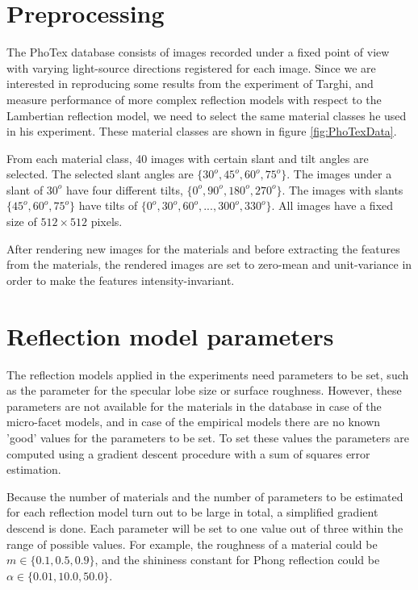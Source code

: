 \hypertarget{experiments}{
}

\section{Preprocessing}\label{sec:preprocessing}
	The PhoTex database consists of images recorded under a fixed point of view with varying light-source directions registered for each image. Since we are interested in reproducing some results from the experiment of Targhi, and measure performance of more complex reflection models with respect to the Lambertian reflection model, we need to select the same material classes he used in his experiment. These material classes are shown in figure \ref{fig:PhoTexData}.

From each material class, 40 images with certain slant and tilt angles are selected. The selected slant angles are $\{30^o, 45^o,60^o,75^o\}$. The images under a slant of $30^o$ have four different tilts, $\{0^o, 90^o, 180^o, 270^o\}$. The images with slants $\{45^o,60^o,75^o\}$ have tilts of $\{0^o,30^o,60^o,...,300^o,330^o\}$. All images have a fixed size of $512 \times 512$ pixels.

After rendering new images for the materials and before extracting the features from the materials, the rendered images are set to zero-mean and unit-variance in order to make the features intensity-invariant.

\section{Reflection model parameters}\label{sec:ParameterSetting}
The reflection models applied in the experiments need parameters to be set, such as the parameter for the specular lobe size or surface roughness. However, these parameters are not available for the materials in the database in case of the micro-facet models, and in case of the empirical models there are no known 'good' values for the parameters to be set. To set these values the parameters are computed using a gradient descent procedure with a sum of squares error estimation. 

Because the number of materials and the number of parameters to be estimated for each reflection model turn out to be large in total, a simplified gradient descend is done. Each parameter will be set to one value out of three within the range of possible values. For example, the roughness of a material could be $m \in \{0.1, 0.5, 0.9\}$, and the shininess constant for Phong reflection could be $\alpha \in \{0.01, 10.0, 50.0\}$. 

